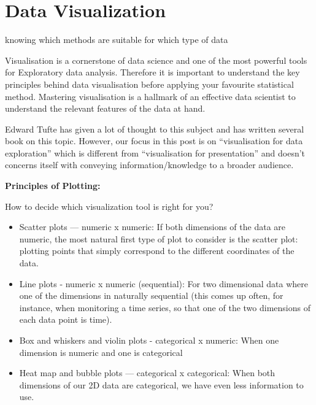\documentclass[openany]{book}
\begin{document}
\section{Data Visualization }

knowing which methods are suitable for which type of data

Visualisation is a cornerstone of data science and one of the most powerful tools for Exploratory data analysis. Therefore it is important to understand the key principles behind data visualisation before applying your favourite statistical method. Mastering visualisation is a hallmark of an effective data scientist to understand the relevant features of the data at hand.

Edward Tufte has given a lot of thought to this subject and has written several book on this topic. However, our focus in this post is on “visualisation for data exploration” which is different from “visualisation for presentation” and doesn't concerns itself with conveying information/knowledge to a broader audience.




\textbf{Principles of Plotting:}

How to decide which visualization tool is right for you?

\begin{itemize}
    \item Scatter plots — numeric x numeric: If both dimensions of the data are numeric, the most natural first type of plot to consider is the scatter plot: plotting points that simply correspond to the different coordinates of the data.

    \item Line plots - numeric x numeric (sequential): For two dimensional data where one of the dimensions in naturally sequential (this comes up often, for instance, when monitoring a time series, so that one of the two dimensions of each data point is time).

    \item Box and whiskers and violin plots - categorical x numeric: When one dimension is numeric and one is categorical

    \item Heat map and bubble plots — categorical x categorical: When both dimensions of our 2D data are categorical, we have even less information to use.

\end{itemize}
\end{document}

